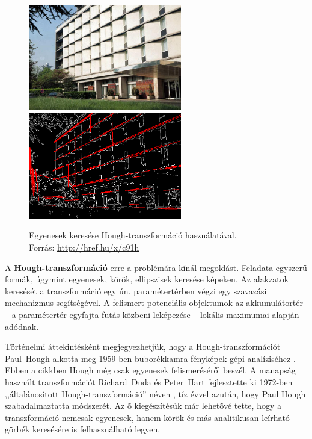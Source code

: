 \begin{figure}[!ht]
\centering
\includegraphics[width=67mm, keepaspectratio]{figures/houghline_building_1.png}\hspace{1cm}
\includegraphics[width=67mm, keepaspectratio]{figures/houghline_building_2.png}
\caption{Egyenesek keresése Hough-transzformáció használatával.\\Forrás: \url{http://href.hu/x/c91h}}
\label{fig:houghlines}
\end{figure}

A \textbf{Hough-transzformáció} erre a problémára kínál megoldást. Feladata egyszerű formák, úgymint egyenesek, körök, ellipszisek keresése képeken. Az alakzatok keresését a transzformáció egy ún. paramétertérben végzi egy szavazási mechanizmus segítségével. A felismert potenciális objektumok az akkumulátortér -- a paramétertér egyfajta futás közbeni leképezése -- lokális maximumai alapján adódnak.

\bigskip

Történelmi áttekintésként megjegyezhetjük, hogy a Hough-transzformációt Paul~Hough alkotta meg 1959-ben buborékkamra-fényképek gépi analíziséhez \cite{hough_eredeti}. Ebben a cikkben Hough még csak egyenesek felismeréséről beszél. A manapság használt transzformációt Richard~Duda és Peter~Hart fejlesztette ki 1972-ben ,,általánosított Hough-transzformáció'' néven \cite{hough_duda}, tíz évvel azután, hogy Paul Hough szabadalmaztatta módszerét. Az õ kiegészítésük már lehetõvé tette, hogy a transzformáció nemcsak egyenesek, hanem körök és más analitikusan leírható görbék keresésére is felhasználható legyen.

